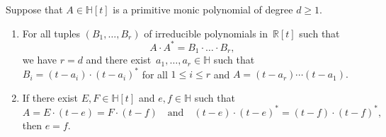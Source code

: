 \documentclass[11pt]{article}
\newenvironment{claims}{\begin{enumerate}[topsep=0pt,itemsep=0pt,leftmargin=8mm,label=\textnormal{\textbf{(\alph*)}},ref=(\alph*)]}{\end{enumerate}}
\newcommand{\RL}[2]{\Cref{lem:#1}\ref{lem:#1:#2}}
\newcommand{\R}{\mathbb{R}}
\renewcommand{\H}{\mathbb{H}}
\newcommand{\st}{such that }
\begin{document}
\begin{lemma}
\label{lem:uni}
Suppose that $A\in\H[t]$ is a primitive monic polynomial of degree $d\geq 1$.
\begin{claims}
\item\label{lem:uni:a}
For all tuples $(B_1,\ldots,B_r)$ of irreducible polynomials in~$\R[t]$
\st
\[
A\cdot A^*=B_1\cdot\ldots\cdot B_r,
\]
we have $r=d$ and
there exist~$a_1,\ldots,a_r\in\H$
\st $B_i=(t-a_i)\cdot (t-a_i)^*$ for all $1\leq i\leq r$ and
$
A=(t-a_r)\cdots(t-a_1).
$

\item\label{lem:uni:b}
If there exist $E,F\in\H[t]$ and $e,f\in\H$ \st
\[
A=E\cdot(t-e)=F\cdot(t-f)
\quad\text{and}\quad
(t-e)\cdot(t-e)^*=(t-f)\cdot(t-f)^*,
\]
then $e=f$.

\end{claims}
\end{lemma}

\end{document}
